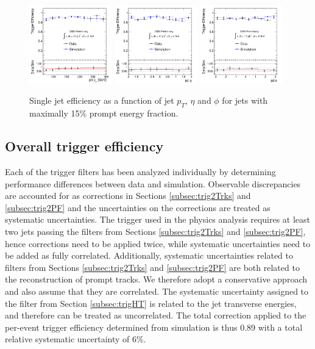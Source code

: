 \begin{figure}[!h]
\centering
 \includegraphics[width=0.32\textwidth]{plots/trigger/effHT300_PF_Pt.pdf}
 \includegraphics[width=0.32\textwidth]{plots/trigger/effHT300_PF_Eta.pdf}
 \includegraphics[width=0.32\textwidth]{plots/trigger/effHT300_PF_Phi.pdf}
\caption{Single jet efficiency as a function of jet $p_T$, $\eta$ and $\phi$ for jets with maximally 15\% prompt energy fraction. \label{fig:eff2PFptetaphi}}
\end{figure}

\subsection{Overall trigger efficiency}

Each of the trigger filters has been analyzed individually by determining performance differences 
between data and simulation. Observable discrepancies are accounted for as corrections in Sections
 \ref{subsec:trig2Trks} and \ref{subsec:trig2PF} and the uncertainties on the corrections are treated as 
systematic uncertainties. The trigger used in the physics analysis requires
 at least two jets passing the filters from Sections \ref{subsec:trig2Trks} and \ref{subsec:trig2PF}, 
hence corrections need to be applied twice, while systematic uncertainties need to be 
added as fully correlated. 
Additionally, systematic uncertainties related to filters from Sections 
\ref{subsec:trig2Trks} and \ref{subsec:trig2PF} are both related to the reconstruction of prompt tracks. We therefore
 adopt a conservative approach and also assume that they are correlated. The systematic uncertainty assigned to 
the filter from Section 
\ref{subsec:trigHT} is related to the jet transverse energies, and therefore can be treated as uncorrelated. 
The total correction applied to the per-event trigger efficiency determined from simulation is thus 0.89 with a total
relative systematic uncertainty of 6\%. 

